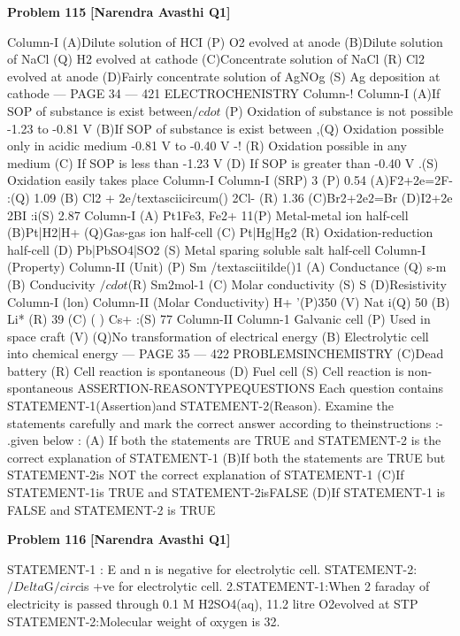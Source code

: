 \begin{problembox}
\textbf{Problem 115} \hfill \textbf{[Narendra Avasthi Q1]}
\label{q:ext-narendra_avasthi_all_questions-115}

Column-I
(A)Dilute solution of HCI
(P) O2 evolved at anode
(B)Dilute solution of NaCl
(Q) H2 evolved at cathode
(C)Concentrate solution of NaCl
(R) Cl2 evolved at anode
(D)Fairly concentrate solution of AgNOg
(S) Ag deposition at cathode
--- PAGE 34 ---
421
ELECTROCHENISTRY
Column-!
Column-I
(A)If SOP of substance is exist between$/cdot$
(P) Oxidation of substance is not possible
-1.23 to -0.81 V
(B)If SOP of substance is exist between
,(Q) Oxidation possible only in acidic medium
-0.81 V to -0.40 V
-!
(R) Oxidation possible in any medium
(C) If SOP is less than -1.23 V
(D) If SOP is greater than -0.40 V
.(S) Oxidation easily takes place
Column-I
Column-I (SRP)
3
(P) 0.54
(A)F2+2e=2F-
:(Q) 1.09
(B) Cl2 + 2e/textasciicircum() 2Cl-
(R) 1.36
(C)Br2+2e$2$=Br
(D)I2+2e 2BI
:i(S) 2.87
Column-I
(A) Pt1Fe3, Fe2+
11(P) Metal-metal ion half-cell
(B)Pt|H2|H+
(Q)Gas-gas ion half-cell
(C) Pt|Hg|Hg2
(R) Oxidation-reduction half-cell
(D) Pb|PbSO4|SO2
(S) Metal sparing soluble salt half-cell
Column-I (Property)
Column-II (Unit)
(P) Sm /textasciitilde()1
(A) Conductance
(Q) s-m
(B) Conducivity
$/cdot$(R) Sm$2$mol-1
(C) Molar conductivity
(S) S
(D)Resistivity
Column-I (lon)
Column-II (Molar Conductivity)
H+
'(P)350
(V)
Nat
i(Q) 50
(B)
Li*
(R) 39
(C)
( )
Cs+
:(S) 77
Column-II
Column-1
Galvanic cell
(P) Used in space craft
(V)
(Q)No transformation of electrical energy
(B)
Electrolytic cell
into chemical energy
--- PAGE 35 ---
422
PROBLEMSINCHEMISTRY
(C)Dead battery
(R) Cell reaction is spontaneous
(D) Fuel cell
(S) Cell reaction is non-spontaneous
ASSERTION-REASONTYPEQUESTIONS
Each question contains STATEMENT-1(Assertion)and STATEMENT-2(Reason).
Examine the statements carefully and mark the correct answer according to theinstructions
:- .given below :
(A) If both the statements are TRUE and STATEMENT-2 is the correct explanation of
STATEMENT-1
(B)If both the statements are TRUE but STATEMENT-2is NOT the correct explanation of
STATEMENT-1
(C)If STATEMENT-1is TRUE and STATEMENT-2isFALSE
(D)If STATEMENT-1 is FALSE and STATEMENT-2 is TRUE
\end{problembox}

\begin{problembox}
\textbf{Problem 116} \hfill \textbf{[Narendra Avasthi Q1]}
\label{q:ext-narendra_avasthi_all_questions-116}

STATEMENT-1 : E and n is negative for electrolytic cell.
STATEMENT-2:$/Delta$G$/circ$is +ve for electrolytic cell.
2.STATEMENT-1:When 2 faraday of electricity is passed through 0.1 M H2SO4(aq), 11.2
litre O2evolved at STP
STATEMENT-2:Molecular weight of oxygen is 32.
\end{problembox}


